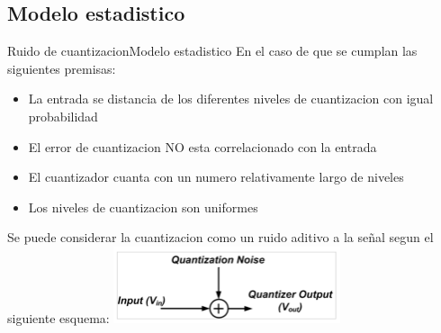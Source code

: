 \begin{darkframes}
      \subsection{Modelo estadistico}
      \begin{frame}{Ruido de cuantizacion}{Modelo estadistico}
         En el caso de que se cumplan las siguientes premisas:
         \begin{itemize}
                \item La entrada se distancia de los diferentes niveles de cuantizacion con igual probabilidad
                \item El error de cuantizacion NO esta correlacionado con la entrada
                \item El cuantizador cuanta con un numero relativamente largo de niveles
                \item Los niveles de cuantizacion son uniformes
         \end{itemize}
            Se puede considerar la cuantizacion como un ruido aditivo a la señal segun el siguiente esquema:
      \center\includegraphics[width=0.5\textwidth]{1_clase/noise_model}
      \vfill
   \end{frame}

\end{darkframes}
